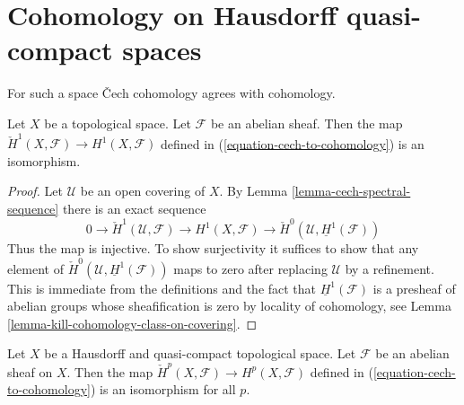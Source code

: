 \section{Cohomology on Hausdorff quasi-compact spaces}
\label{section-cohomology-LC}

\noindent
For such a space {\v C}ech cohomology agrees with cohomology.

\begin{lemma}
\label{lemma-cech-always}
Let $X$ be a topological space. Let $\mathcal{F}$ be an abelian sheaf. Then
the map $\check{H}^1(X, \mathcal{F}) \to H^1(X, \mathcal{F})$ defined
in (\ref{equation-cech-to-cohomology}) is an isomorphism.
\end{lemma}

\begin{proof}
Let $\mathcal{U}$ be an open covering of $X$.
By Lemma \ref{lemma-cech-spectral-sequence}
there is an exact sequence
$$
0 \to \check{H}^1(\mathcal{U}, \mathcal{F}) \to H^1(X, \mathcal{F})
\to \check{H}^0(\mathcal{U}, \underline{H}^1(\mathcal{F}))
$$
Thus the map is injective. To show surjectivity it suffices to show that
any element of $\check{H}^0(\mathcal{U}, \underline{H}^1(\mathcal{F}))$
maps to zero after replacing $\mathcal{U}$ by a refinement.
This is immediate from the definitions and the fact that
$\underline{H}^1(\mathcal{F})$ is a presheaf of abelian groups
whose sheafification is zero by locality of cohomology, see
Lemma \ref{lemma-kill-cohomology-class-on-covering}.
\end{proof}

\begin{lemma}
\label{lemma-cech-Hausdorff-quasi-compact}
Let $X$ be a Hausdorff and quasi-compact topological space. Let
$\mathcal{F}$ be an abelian sheaf on $X$. Then
the map $\check{H}^p(X, \mathcal{F}) \to H^p(X, \mathcal{F})$ defined
in (\ref{equation-cech-to-cohomology}) is an isomorphism for
all $p$.
\end{lemma}

